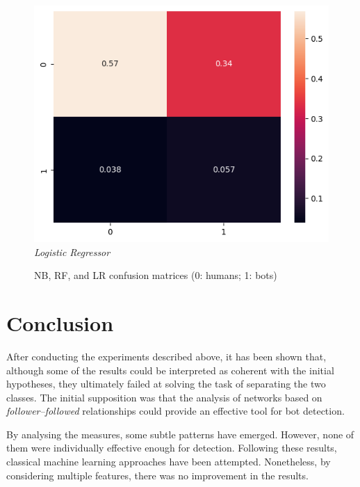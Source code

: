 \documentclass[12pt, a4paper]{article}
\begin{document}
\begin{figure}[H]
    		\hfill
    		\begin{minipage}[b]{0.46\textwidth}    				
        		\centering
        		\includegraphics[width=\textwidth]{complete_lr_confusion_matrix.png}
        		\textit{\small Logistic Regressor}
    		\end{minipage}
    		\caption{NB, RF, and LR confusion matrices (0: humans; 1: bots)}
		\end{figure}
		

\section{Conclusion} \label{conclusion}
	After conducting the experiments described above, it has been shown that, although some of the results could be interpreted as coherent with the initial hypotheses, they ultimately failed at solving the task of separating the two classes. The initial supposition was that the analysis of networks based on \textit{follower--followed} relationships could provide an effective tool for bot detection.
	\vspace{0.2cm}
	
	By analysing the measures, some subtle patterns have emerged. However, none of them were individually effective enough for detection.
	Following these results, classical machine learning approaches have been attempted. Nonetheless, by considering multiple features, there was no improvement in the results.	
\end{document}
